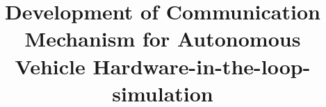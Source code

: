 \documentclass[conference]{config/paper/IEEEtran}
\begin{document}
\title{Development of Communication Mechanism for Autonomous Vehicle
	Hardware-in-the-loop-simulation}



\maketitle












% 

\printbibliography

\end{document}
